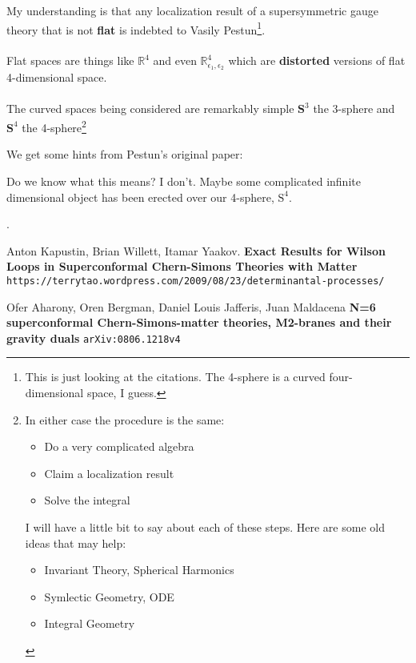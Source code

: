 \documentclass[12pt]{article}
\begin{document}
\noindent My understanding is that any localization result of a supersymmetric gauge theory that is not \textbf{flat} is indebted to Vasily Pestun\footnote{This is just looking at the citations.  The 4-sphere is a curved four-dimensional space, I guess.}.   \\ \\
Flat spaces are things like $\mathbb{R}^4$ and even $\mathbb{R}^4_{\epsilon_1, \epsilon_2}$ which are \textbf{distorted} versions of flat 4-dimensional space.  \\ \\
The curved spaces being considered are remarkably simple $\textbf{S}^3$ the 3-sphere and $\textbf{S}^4$ the 4-sphere\footnote{  In either case the procedure is the same:
\begin{itemize}
\item Do a very complicated algebra
\item Claim a localization result
\item Solve the integral
\end{itemize}
I will have a little bit to say about each of these steps.  Here are some old ideas that may help:
\begin{itemize}
\item Invariant Theory, Spherical Harmonics
\item Symlectic Geometry, ODE 
\item Integral Geometry
\end{itemize}}


\noindent We get some hints from Pestun's original paper:
\begin{quotation}
\noindent {\color{blue}{equivariant Euler class of the infinite-dimensional normal
bundle to the localization locus}}
\end{quotation}
Do we know what this means?  I don't. Maybe some complicated infinite dimensional object has been erected over our 4-sphere, $\text{S}^4$.
\newpage

\noindent .

\newpage

\selectfont \fontsize{12}{10}\selectfont

\begin{thebibliography}{}


\item Anton Kapustin, Brian Willett, Itamar Yaakov.  \textbf{Exact Results for Wilson Loops in Superconformal Chern-Simons Theories with Matter } \\ \texttt{https://terrytao.wordpress.com/2009/08/23/determinantal-processes/}

\item Ofer Aharony, Oren Bergman, Daniel Louis Jafferis, Juan Maldacena \textbf{N=6 superconformal Chern-Simons-matter theories, M2-branes and their gravity duals}
\texttt{arXiv:0806.1218v4}


\end{thebibliography}
\end{document}
